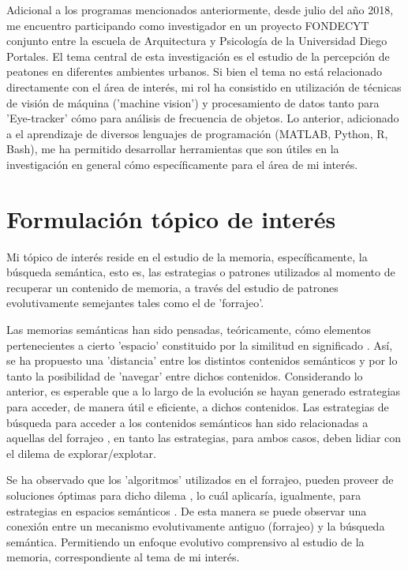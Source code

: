 \documentclass[11pt]{article}
\begin{document}
Adicional a los programas mencionados anteriormente, desde julio del año
2018, me encuentro participando como investigador en un proyecto
FONDECYT conjunto entre la escuela de Arquitectura y Psicología de la
Universidad Diego Portales. El tema central de esta investigación es el
estudio de la percepción de peatones en diferentes ambientes
urbanos. Si bien el tema no está relacionado directamente con el área
de interés, mi rol ha consistido en utilización de técnicas de visión
de máquina ('machine vision') y procesamiento de datos tanto para
'Eye-tracker' cómo para análisis de frecuencia de objetos. Lo
anterior, adicionado a el aprendizaje de diversos lenguajes de
programación (MATLAB, Python, R, Bash), me ha permitido desarrollar
herramientas que son útiles en la investigación en general cómo
específicamente para el área de mi interés.

\section{Formulación tópico de interés}
\label{sec:org8731e1d}
Mi tópico de interés reside en el estudio de la memoria, específicamente, la
búsqueda semántica, esto es, las estrategias o patrones utilizados al momento de
recuperar un contenido de memoria, a través del estudio de patrones
evolutivamente semejantes tales como el de 'forrajeo'.

 Las memorias semánticas han sido pensadas, teóricamente, cómo elementos
pertenecientes a cierto 'espacio' constituido por la similitud en significado
\citep{lundProducingHighdimensionalSemantic1996}. Así, se ha propuesto una
'distancia' entre los distintos contenidos semánticos
\citep{montezRoleSemanticClustering2015} y por lo tanto la posibilidad de
'navegar' entre dichos contenidos. Considerando lo anterior, es esperable que a
lo largo de la evolución se hayan generado estrategias para acceder, de manera
útil e eficiente, a dichos contenidos. Las estrategias de búsqueda para acceder
a los contenidos semánticos han sido relacionadas a aquellas del forrajeo
\citep{ForagingSemanticFields,hillsAnimalForagingEvolution2006,hillsOptimalForagingSemantic2012},
en tanto las estrategias, para ambos casos, deben lidiar con el dilema de
explorar/explotar.

Se ha observado que los 'algoritmos' utilizados en el forrajeo, pueden proveer
de soluciones óptimas para dicho dilema
\citep{bartumeusAnimalSearchStrategies2005a}, lo cuál aplicaría, igualmente, para
estrategias en espacios semánticos \citep{montezRoleSemanticClustering2015}. De
esta manera se puede observar una conexión entre un mecanismo evolutivamente
antiguo (forrajeo) y la búsqueda semántica. Permitiendo un enfoque evolutivo
comprensivo al estudio de la memoria, correspondiente al tema de mi interés.
\end{document}
